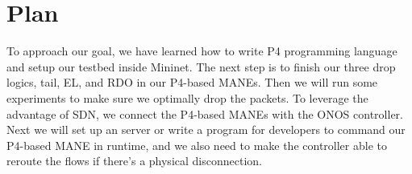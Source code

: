\section{Plan} \label{sec:Plan}

To approach our goal, we have learned how to write P4 programming language and setup our testbed inside Mininet. The next step is to finish our three drop logics, tail, EL, and RDO in our P4-based MANEs. Then we will run some experiments to make sure we optimally drop the packets. To leverage the advantage of SDN, we connect the P4-based MANEs with the ONOS controller. Next we will set up an server or write a program for developers to command our P4-based MANE in runtime, and we also need to make the controller able to reroute the flows if there's a physical disconnection.